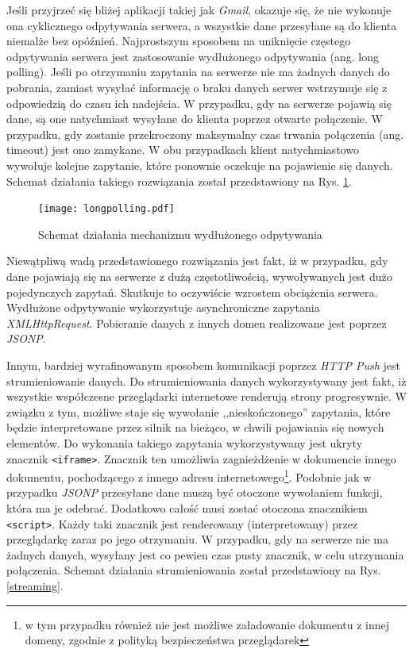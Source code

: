 \documentclass[11pt,twoside]{report}
\providecommand{\imref}[1]{Rys. \ref{#1}} %
\begin{document}
Jeśli przyjrzeć się bliżej aplikacji takiej jak \emph{Gmail}, okazuje
się, że nie wykonuje ona cyklicznego odpytywania serwera, a wszystkie
dane przesyłane są do klienta niemalże bez opóźnień. Najprostszym
sposobem na uniknięcie częstego odpytywania serwera jest zastosowanie
wydłużonego odpytywania (ang. long polling). Jeśli po otrzymaniu
zapytania na serwerze nie ma żadnych danych do pobrania, zamiast
wysyłać informację o braku danych serwer wstrzymuje się z odpowiedzią
do czasu ich nadejścia. W przypadku, gdy na serwerze pojawią się dane,
są one natychmiast wysyłane do klienta poprzez otwarte połączenie. W
przypadku, gdy zostanie przekroczony maksymalny czas trwania
połączenia (ang. timeout) jest ono zamykane. W obu przypadkach klient
natychmiastowo wywołuje kolejne zapytanie, które ponownie oczekuje na
pojawienie się danych. Schemat działania takiego rozwiązania został
przedstawiony na \imref{longpolling}.

\begin{figure}[ht]
  \begin{center}
    \texttt{[image: longpolling.pdf]}
  \end{center}
  \caption{Schemat działania mechanizmu wydłużonego odpytywania}
  \label{longpolling}
\end{figure}

Niewątpliwą wadą przedstawionego rozwiązania jest fakt, iż w
przypadku, gdy dane pojawiają się na serwerze z dużą częstotliwością,
wywoływanych jest dużo pojedynczych zapytań. Skutkuje to oczywiście
wzrostem obciążenia serwera. Wydłużone odpytywanie wykorzystuje
asynchroniczne zapytania \emph{XMLHttpRequest}. Pobieranie danych z
innych domen realizowane jest poprzez \emph{JSONP}.

Innym, bardziej wyrafinowanym sposobem komunikacji poprzez \emph{HTTP
  Push} jest strumieniowanie danych. Do strumieniowania danych
wykorzystywany jest fakt, iż wszystkie współczesne przeglądarki
internetowe renderują strony progresywnie. W związku z tym, możliwe
staje się wywołanie ,,nieskończonego'' zapytania, które będzie
interpretowane przez silnik na bieżąco, w chwili pojawiania się nowych
elementów. Do wykonania takiego zapytania wykorzystywany jest ukryty
znacznik \texttt{<iframe>}. Znacznik ten umożliwia zagnieżdżenie w
dokumencie innego dokumentu, pochodzącego z innego adresu
internetowego\footnote{w tym przypadku również nie jest możliwe
  załadowanie dokumentu z innej domeny, zgodnie z polityką
  bezpieczeństwa przeglądarek}. Podobnie jak w przypadku \emph{JSONP}
przesyłane dane muszą być otoczone wywołaniem funkcji, która ma je
odebrać. Dodatkowo całość musi zostać otoczona znacznikiem
\texttt{<script>}. Każdy taki znacznik jest renderowany
(interpretowany) przez przeglądarkę zaraz po jego otrzymaniu. W
przypadku, gdy na serwerze nie ma żadnych danych, wysyłany jest co
pewien czas pusty znacznik, w celu utrzymania połączenia. Schemat
działania strumieniowania został przedstawiony na \imref{streaming}.
\end{document}
